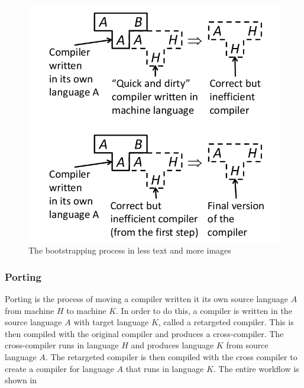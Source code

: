 \documentclass{article}
\begin{document}
\begin{figure}[h]
	\center
	\includegraphics[width=\textwidth]{bootstrapping.png}
	\caption{The bootstrapping process in less text and more images}
	\label{fig:bootstrapping}
\end{figure}

\subsubsection{Porting}
Porting is the process of moving a compiler written it its own source language $A$ from machine $H$ to machine $K$.
In order to do this, a compiler is written in the source language $A$ with target language $K$, called a retargeted compiler.
This is then compiled with the original compiler and produces a cross-compiler.
The cross-compiler runs in language $H$ and produces language $K$ from source language $A$.
The retargeted compiler is then compiled with the cross compiler to create a compiler for language $A$ that runs in language $K$.
The entire workflow is shown in 
\end{document}

